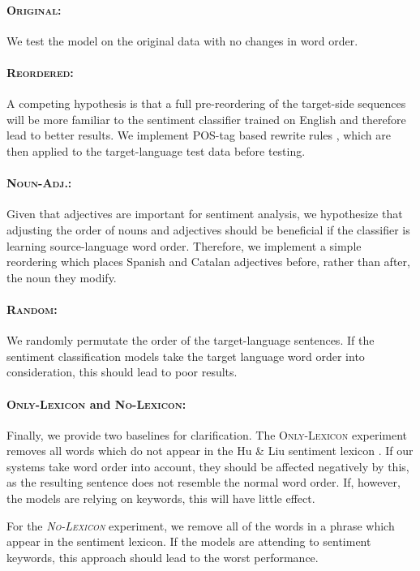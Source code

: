 \documentclass[a4paper,11pt,twocolumn,twoside]{article}
\newcommand{\original}{\textsc{Original}\xspace}
\newcommand{\mtreordered}{\textsc{Reordered}\xspace}
\newcommand{\nadj}{\textsc{Noun-Adj.}\xspace}
\newcommand{\random}{\textsc{Random}\xspace}
\newcommand{\onlylex}{\textsc{Only-Lexicon}\xspace}
\newcommand{\nolex}{\textsc{No-Lexicon}\xspace}
\begin{document}
\paragraph{\original: } We test the model on the original data with no changes in word order.

\paragraph{\mtreordered: }A competing hypothesis is that a full pre-reordering of the target-side sequences will be more familiar to the sentiment classifier trained on English and therefore lead to better results. We implement POS-tag based rewrite rules \cite{Crego2006,Crego2006b}, which are then applied to the target-language test data before testing.

\paragraph{\nadj: }Given that adjectives are important for sentiment analysis, we hypothesize that adjusting the order of nouns and adjectives should be beneficial if the classifier is learning source-language word order. Therefore, we implement a simple reordering which places Spanish and Catalan adjectives before, rather than after, the noun they modify.

\paragraph{\random: }We randomly permutate the order of the target-language sentences. If the sentiment classification models take the target language word order into consideration, this should lead to poor results.

\paragraph{\onlylex and \nolex: }Finally, we provide two baselines for clarification. The \onlylex experiment removes all words which do
not appear in the Hu \& Liu sentiment lexicon \cite{HuandLiu2004}. If our systems
take word order into account, they should be affected negatively by this, as the
resulting sentence does not resemble the normal word order. If, however, the models
are relying on keywords, this will have little effect.

For the \emph{\nolex} experiment, we remove all of the words
in a phrase which appear in the sentiment lexicon. If the models are attending to
sentiment keywords, this approach should lead to the worst performance. 
\end{document}
